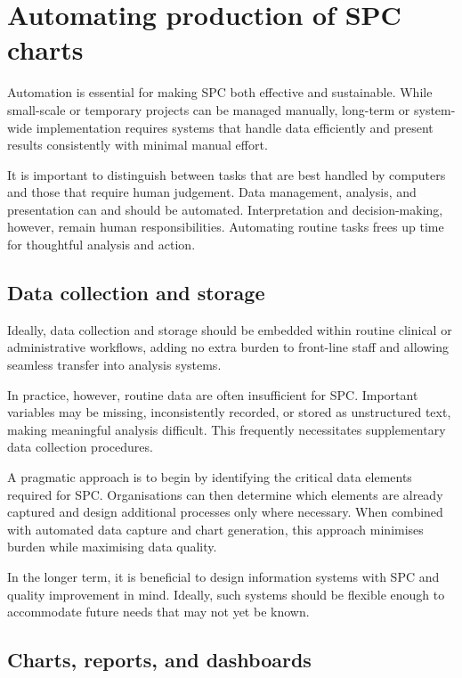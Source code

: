 \documentclass[
]{book}
\begin{document}
\section{Automating production of SPC charts}\label{automating-production-of-spc-charts}

Automation is essential for making SPC both effective and sustainable. While small-scale or temporary projects can be managed manually, long-term or system-wide implementation requires systems that handle data efficiently and present results consistently with minimal manual effort.

It is important to distinguish between tasks that are best handled by computers and those that require human judgement. Data management, analysis, and presentation can and should be automated. Interpretation and decision-making, however, remain human responsibilities. Automating routine tasks frees up time for thoughtful analysis and action.

\subsection{Data collection and storage}\label{data-collection-and-storage}

Ideally, data collection and storage should be embedded within routine clinical or administrative workflows, adding no extra burden to front-line staff and allowing seamless transfer into analysis systems.

In practice, however, routine data are often insufficient for SPC. Important variables may be missing, inconsistently recorded, or stored as unstructured text, making meaningful analysis difficult. This frequently necessitates supplementary data collection procedures.

A pragmatic approach is to begin by identifying the critical data elements required for SPC. Organisations can then determine which elements are already captured and design additional processes only where necessary. When combined with automated data capture and chart generation, this approach minimises burden while maximising data quality.

In the longer term, it is beneficial to design information systems with SPC and quality improvement in mind. Ideally, such systems should be flexible enough to accommodate future needs that may not yet be known.

\subsection{Charts, reports, and dashboards}\label{charts-reports-and-dashboards}
\end{document}
